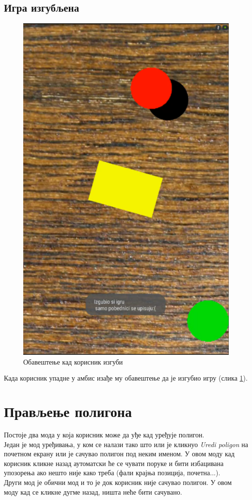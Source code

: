 \subsection{Игра изгубљена}
\begin{figure}[htb!]
\begin{center}
\includegraphics[scale=.4]{pictures/game/gameLose}
\caption{Обавештење кад корисник изгуби}\label{fig:gameLose}
\end{center}
\end{figure}
Када корисник упадне у амбис изађе му обавештење да је изгубио игру (слика \ref{fig:gameLose}). 

\section{Прављење полигона}
Постоје два мода у која корисник може да уђе кад уређује полигон. 
\\ \indent Један је мод уређивања, у ком се налази тако што или је кликнуо \emph{Uredi poligon} на почетном екрану или је сачувао полигон под неким именом. У овом моду кад корисник кликне назад аутоматски ће се чувати поруке и бити избацивана упозорења ако нешто није како треба (фали крајња позиција, почетна...). 
\\ \indent Други мод је обични мод и то је док корисник није сачувао полигон. У овом моду кад се кликне дугме назад, ништа неће бити сачувано. 
